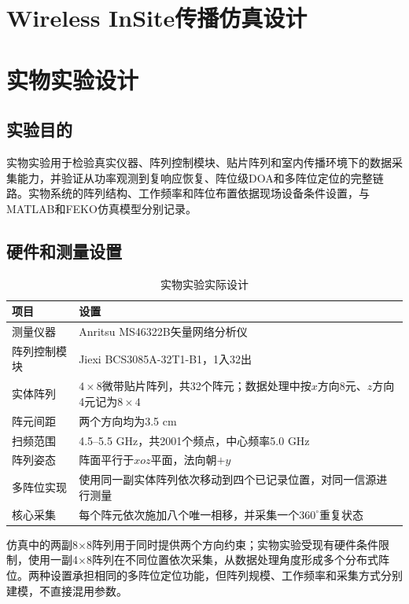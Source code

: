 \documentclass[UTF8,a4paper,12pt]{ctexart}
\begin{document}
\clearpage
\section{Wireless InSite传播仿真设计}

\vspace{8cm}

\clearpage
\section{实物实验设计}

\subsection{实验目的}

实物实验用于检验真实仪器、阵列控制模块、贴片阵列和室内传播环境下的数据采集能力，并验证从功率观测到复响应恢复、阵位级DOA和多阵位定位的完整链路。实物系统的阵列结构、工作频率和阵位布置依据现场设备条件设置，与MATLAB和FEKO仿真模型分别记录。

\subsection{硬件和测量设置}

\begin{table}[htbp]
\centering
\caption{实物实验实际设计}
\begin{tabularx}{\textwidth}{p{3.2cm}Y}
\toprule
项目 & 设置\\
\midrule
测量仪器 & Anritsu MS46322B矢量网络分析仪\\
阵列控制模块 & Jiexi BCS3085A-32T1-B1，1入32出\\
实体阵列 & $4\times8$微带贴片阵列，共32个阵元；数据处理中按$x$方向8元、$z$方向4元记为$8\times4$\\
阵元间距 & 两个方向均为3.5 cm\\
扫频范围 & 4.5--5.5 GHz，共2001个频点，中心频率5.0 GHz\\
阵列姿态 & 阵面平行于$xoz$平面，法向朝$+y$\\
多阵位实现 & 使用同一副实体阵列依次移动到四个已记录位置，对同一信源进行测量\\
核心采集 & 每个阵元依次施加八个唯一相移，并采集一个$360^\circ$重复状态\\
\bottomrule
\end{tabularx}
\end{table}

仿真中的两副8×8阵列用于同时提供两个方向约束；实物实验受现有硬件条件限制，使用一副4×8阵列在不同位置依次采集，从数据处理角度形成多个分布式阵位。两种设置承担相同的多阵位定位功能，但阵列规模、工作频率和采集方式分别建模，不直接混用参数。
\end{document}
